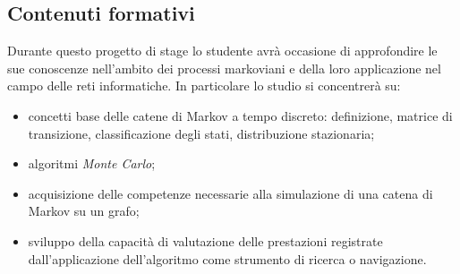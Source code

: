 \subsection{Contenuti formativi}
Durante questo progetto di stage lo studente avrà occasione di approfondire le sue conoscenze nell'ambito dei processi markoviani e della loro applicazione nel campo delle reti informatiche.
	\newline
	In particolare lo studio si concentrerà su:
	\begin{itemize}
		\item concetti base delle catene di Markov a tempo discreto: definizione, matrice di transizione, classificazione degli stati, distribuzione stazionaria;
		\item algoritmi \textit{Monte Carlo};
		\item acquisizione delle competenze necessarie alla simulazione di una catena di Markov su un grafo;
		\item sviluppo della capacità di valutazione delle prestazioni registrate dall'applicazione dell'algoritmo come strumento di ricerca o navigazione.
	\end{itemize}

